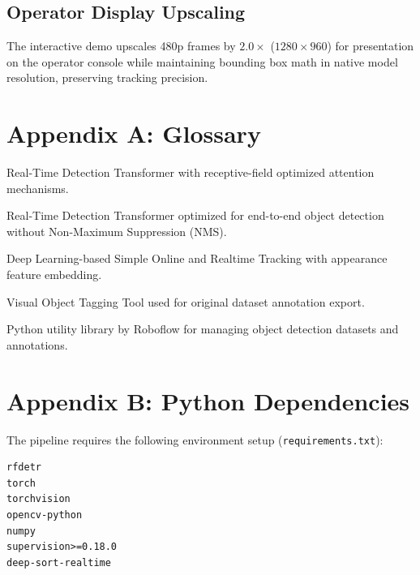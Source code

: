 \documentclass[11pt,a4paper]{article}
\begin{document}
\subsection{Operator Display Upscaling}
The interactive demo upscales 480p frames by $2.0\times$ ($1280\times960$) for presentation on the operator console while maintaining bounding box math in native model resolution, preserving tracking precision.

\newpage

\appendix
\section{Appendix A: Glossary}

\begin{description}[style=nextline]
    \item[\textbf{RF-DETR}] Real-Time Detection Transformer with receptive-field optimized attention mechanisms.
    \item[\textbf{RT-DETR}] Real-Time Detection Transformer optimized for end-to-end object detection without Non-Maximum Suppression (NMS).
    \item[\textbf{DeepSORT}] Deep Learning-based Simple Online and Realtime Tracking with appearance feature embedding.
    \item[\textbf{VoTT}] Visual Object Tagging Tool used for original dataset annotation export.
    \item[\textbf{Supervision}] Python utility library by Roboflow for managing object detection datasets and annotations.
\end{description}

\section{Appendix B: Python Dependencies}
The pipeline requires the following environment setup (\texttt{requirements.txt}):

\begin{lstlisting}[caption={\texttt{requirements.txt} Configuration}]
rfdetr
torch
torchvision
opencv-python
numpy
supervision>=0.18.0
deep-sort-realtime
\end{lstlisting}
\end{document}
